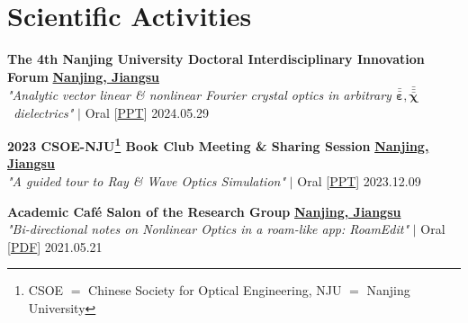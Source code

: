 
\section{Scientific Activities}
\begin{etaremune}[label={[\reversearabic*]},leftmargin=0.041\textwidth,itemsep=0pt]
	{\item \textbf{The 4th Nanjing University Doctoral Interdisciplinary Innovation Forum} \hfill \href{https://www.google.com/maps/place/\%E4\%B8\%AD\%E5\%9B\%BD\%E6\%B1\%9F\%E8\%8B\%8F\%E7\%9C\%81\%E5\%8D\%97\%E4\%BA\%AC\%E5\%B8\%82}{\textbf{Nanjing, Jiangsu}} \\ \textit{ "Analytic vector linear \& nonlinear Fourier crystal optics in arbitrary $\bar{\bar{\boldsymbol \varepsilon}}, \bar{\bar{\bar{\boldsymbol \chi}}}$ dielectrics"} $|$ {\color{color-detail} Oral} [\href{https://www.google.com/maps/place/\%E4\%B8\%AD\%E5\%9B\%BD\%E6\%B1\%9F\%E8\%8B\%8F\%E7\%9C\%81\%E5\%8D\%97\%E4\%BA\%AC\%E5\%B8\%82}{\small PPT}] \hfill 2024.05.29}
	{\item \textbf{2023 CSOE-NJU\footnote{CSOE $=$ Chinese Society for Optical Engineering, NJU $=$ Nanjing University} Book Club Meeting \& Sharing Session} \hfill \href{https://www.google.com/maps/place/\%E4\%B8\%AD\%E5\%9B\%BD\%E6\%B1\%9F\%E8\%8B\%8F\%E7\%9C\%81\%E5\%8D\%97\%E4\%BA\%AC\%E5\%B8\%82}{\textbf{Nanjing, Jiangsu}} \\ \textit{ "A guided tour to Ray \& Wave Optics Simulation"} $|$ {\color{color-detail} Oral} [\href{https://github.com/ChenZhu-Xie/PhD_academia/blob/master/2__Side_Projects/7.1__A_guided_tour_to_Ray_\%26_Wave_Optics_Simulation_\%E2\%86\%90_JavaScript\%2BPython__3.5_year_-_2023.12.9.pdf}{\small PPT}] \hfill 2023.12.09}
	{\item \textbf{Academic Café Salon of the Research Group} \hfill \href{https://www.google.com/maps/place/\%E4\%B8\%AD\%E5\%9B\%BD\%E6\%B1\%9F\%E8\%8B\%8F\%E7\%9C\%81\%E5\%8D\%97\%E4\%BA\%AC\%E5\%B8\%82}{\textbf{Nanjing, Jiangsu}} \\ \textit{ "Bi-directional notes on Nonlinear Optics in a roam-like app: RoamEdit"} $|$ {\color{color-detail} Oral} [\href{https://github.com/ChenZhu-Xie/postgraduate_academia/blob/main/2__Side_Projects/2.1__Reading_Club\%EF\%BC\%9ANotes_with_Bi-directional_Links_in_RoamEdit__1.0_year_-_2021.5.21.pdf}{\small PDF}] \hfill 2021.05.21}
\end{etaremune}

%	
%
%
